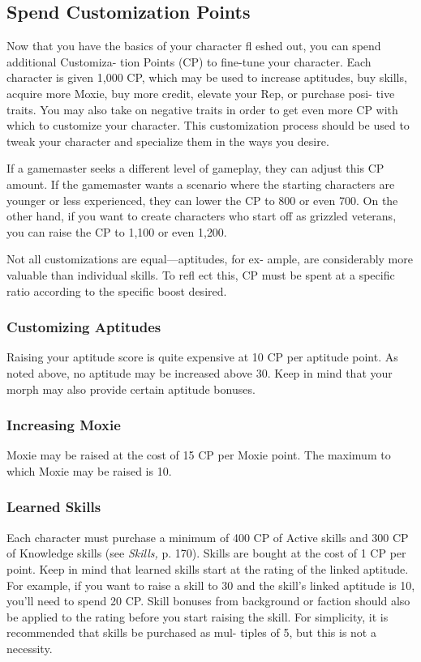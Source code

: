 \subsection{Spend Customization Points}

Now that you have the basics of your character 
fl eshed out, you can spend additional Customiza-
tion Points (CP) to fine-tune your character. Each 
character is given 1,000 CP, which may be used to 
increase aptitudes, buy skills, acquire more Moxie, 
buy more credit, elevate your Rep, or purchase posi-
tive traits. You may also take on negative traits in 
order to get even more CP with which to customize 
your character. This customization process should be 
used to tweak your character and specialize them in 
the ways you desire.

If a gamemaster seeks a different level of gameplay, 
they can adjust this CP amount. If the gamemaster 
wants a scenario where the starting characters are 
younger or less experienced, they can lower the CP 
to 800 or even 700. On the other hand, if you want 
to create characters who start off as grizzled veterans, 
you can raise the CP to 1,100 or even 1,200.

Not all customizations are equal—aptitudes, for ex-
ample, are considerably more valuable than individual 
skills. To refl ect this, CP must be spent at a specific 
ratio according to the specific boost desired.

\subsubsection{Customizing Aptitudes}

Raising your aptitude score is quite expensive at 10 
CP per aptitude point. As noted above, no aptitude 
may be increased above 30. Keep in mind that your 
morph may also provide certain aptitude bonuses.

\subsubsection{Increasing Moxie}

Moxie may be raised at the cost of 15 CP per Moxie 
point. The maximum to which Moxie may be raised 
is 10.

\subsubsection{Learned Skills}

Each character must purchase a minimum of 400 CP 
of Active skills and 300 CP of Knowledge skills (see 
\textit{Skills,} p. 170). Skills are bought at the cost of 1 CP 
per point. Keep in mind that learned skills start at the 
rating of the linked aptitude. For example, if you want 
to raise a skill to 30 and the skill's linked aptitude 
is 10, you'll need to spend 20 CP. Skill bonuses from 
background or faction should also be applied to the 
rating before you start raising the skill. For simplicity, 
it is recommended that skills be purchased as mul-
tiples of 5, but this is not a necessity.


